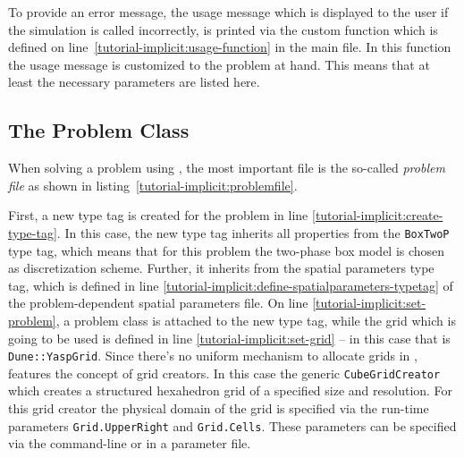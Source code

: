 \begin{lst}\label{tutorial-implicit:parameter-file} \mbox{}

\end{lst}

To provide an error message, the usage message which is displayed to
the user if the simulation is called incorrectly, is printed via the
custom function which is defined on
line~\ref{tutorial-implicit:usage-function} in the main file.
In this function the usage message is customized to the problem at hand.
This means that at least the necessary parameters are listed here.

\subsection{The Problem Class}
\label{tutorial-implicit:problem}
When solving a problem using \Dumux, the most important file is the
so-called \textit{problem file} as shown in
listing~\ref{tutorial-implicit:problemfile}.

\begin{lst}\label{tutorial-implicit:problemfile} \mbox{}

\end{lst}

First, a new type tag is created for the problem in line
\ref{tutorial-implicit:create-type-tag}.  In this case, the new type
tag inherits all properties from the \texttt{BoxTwoP} type tag, which
means that for this problem the two-phase box model is chosen as
discretization scheme. Further, it inherits from the spatial
parameters type tag, which is defined in line
\ref{tutorial-implicit:define-spatialparameters-typetag} of the problem-dependent spatial
parameters file.  On line
\ref{tutorial-implicit:set-problem}, a problem class is attached to the
new type tag, while the grid which is going to be used is defined in
line \ref{tutorial-implicit:set-grid} -- in this case that is
\texttt{Dune::YaspGrid}.  Since there's no uniform mechanism to
allocate grids in \Dune, \Dumux features the concept of grid creators.
In this case the generic \texttt{CubeGridCreator} which creates a
structured hexahedron grid of a specified size and resolution. For
this grid creator the  physical domain of the grid is specified via the
run-time parameters \texttt{Grid.UpperRight} and
\texttt{Grid.Cells}. These parameters can be specified via
the command-line or in a parameter file.

